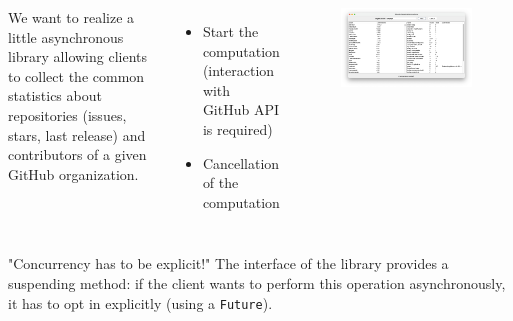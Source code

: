 \documentclass[aspectratio=169,xcolor=dvipsnames]{beamer}
\begin{document}
\begin{frame}
    \begin{columns}[c,onlytextwidth] %
        \begin{example}[2]
            We want to realize a little asynchronous library allowing clients to collect the common statistics about repositories (issues, stars, last release) and contributors of a given GitHub organization.
        \end{example}
        \begin{itemize}
            \item Start the computation (interaction with GitHub API is required)
            \item Cancellation of the computation
        \end{itemize}
        \begin{figure}
            \centering
            \includegraphics[width=\textwidth]{./images/analyzer-e2e.png}
        \end{figure}
    \end{columns}
\end{frame}


\begin{frame}{"Concurrency has to be explicit!"}
    The interface of the library provides a suspending method: if the client wants to perform this operation asynchronously, it has to opt in explicitly (using a \texttt{Future}).
    
\end{frame}
\end{document}
